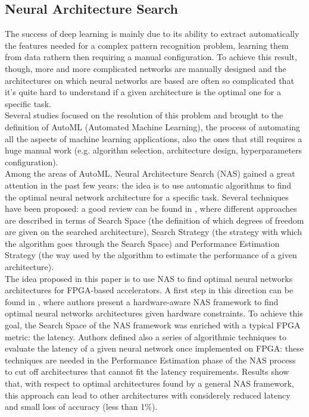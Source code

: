 \documentclass[11pt,a4paper]{article}
\begin{document}
\subsection{Neural Architecture Search}
The success of deep learning is mainly due to its ability to extract automatically the features needed for a complex pattern recognition problem, learning them from data rathern then requiring a manual configuration. To achieve this result, though, more and more complicated networks are manually designed and the architectures on which neural networks are based are often so complicated that it's quite hard to understand if a given architecture is the optimal one for a specific task.
\\Several studies focused on the resolution of this problem and brought to the definition of AutoML (Automated Machine Learning), the process of automating all the aspects of machine learning applications, also the ones that still requires a huge manual work (e.g. algorithm selection, architecture design, hyperparameters configuration).
\\Among the areas of AutoML, Neural Architecture Search (NAS) gained a great attention in the past few years: the idea is to use automatic algorithms to find the optimal neural network architecture for a specific task. Several techniques have been proposed: a good review can be found in \cite{elsken_nas_2018}, where different approaches are described in terms of Search Space (the definition of which degrees of freedom are given on the searched architecture), Search Strategy (the strategy with which the algorithm goes through the Search Space) and Performance Estimation Strategy (the way used by the algorithm to estimate the performance of a given architecture).
\\The idea proposed in this paper is to use NAS to find optimal neural networks architectures for FPGA-based accelerators. A first step in this direction can be found in \cite{jiang_nas_fpga_2019}, where authors present a hardware-aware NAS framework to find optimal neural networks architectures given hardware constraints. To achieve this goal, the Search Space of the NAS framework was enriched with a typical FPGA metric: the latency. Authors defined also a series of algorithmic techniques to evaluate the latency of a given neural network once implemented on FPGA: these techniques are needed in the Performance Estimation phase of the NAS process to cut off architectures that cannot fit the latency requirements. Results show that, with respect to optimal architectures found by a general NAS framework, this approach can lead to other architectures with considerely reduced latency and small loss of accuracy (less than 1\%).
\end{document}
